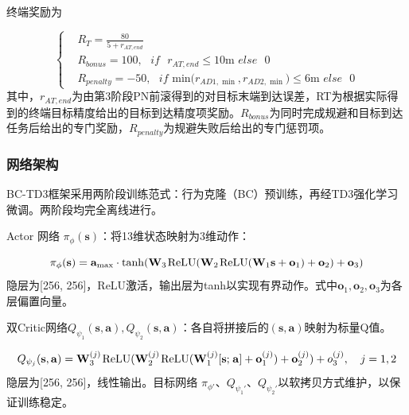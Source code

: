 终端奖励为

\begin{equation}
\label{eq:75}
\left\{
\begin{aligned}
& {R_T} = \frac{{80}}{{5 + {r_{AT,end}}}} \\
& {R_{bonus}} = 100,{\text{ }}if{\text{ }}{r_{AT,end}} \leqslant 10{\text{m }}else{\text{ }}0 \\
& {R_{penalty}} =  - 50,{\text{ }}if{\text{ min(}}{r_{AD1,\min }},{r_{AD2,\min }}{\text{)}} \leqslant 6{\text{m }}else{\text{ }}0
\end{aligned}
\right.
\end{equation}
其中，${r_{AT,end}}$为由第3阶段PN前滚得到的对目标末端到达误差，RT为根据实际得到的终端目标精度给出的目标到达精度项奖励。${R_{bonus}}$为同时完成规避和目标到达任务后给出的专门奖励，${R_{penalty}}$为规避失败后给出的专门惩罚项。

\subsubsection{网络架构}
BC-TD3框架采用两阶段训练范式：行为克隆（BC）预训练，再经TD3强化学习微调。两阶段均完全离线进行。

Actor 网络 ${\pi _\phi }({\mathbf{s}})$：将13维状态映射为3维动作：

\begin{equation}
\label{eq:76}
{\pi _\phi }({\mathbf{s}}) = {{\mathbf{a}}_{\max }} \cdot \tanh ({{\mathbf{W}}_3}{\kern 1pt} {\text{ReLU}}({{\mathbf{W}}_2}{\kern 1pt} {\text{ReLU}}({{\mathbf{W}}_1}{\mathbf{s}} + {{\mathbf{o}}_1}) + {{\mathbf{o}}_2}) + {{\mathbf{o}}_3})
\end{equation}
隐层为[256, 256]，ReLU激活，输出层为tanh以实现有界动作。式中${{\mathbf{o}}_1},{{\mathbf{o}}_2},{{\mathbf{o}}_3}$为各层偏置向量。

双Critic网络${Q_{{\psi _1}}}({\mathbf{s}},{\mathbf{a}}),{Q_{{\psi _2}}}({\mathbf{s}},{\mathbf{a}})$：各自将拼接后的$({\mathbf{s}},{\mathbf{a}})$映射为标量Q值。

\begin{equation}
\label{eq:77}
{Q_{{\psi _j}}}({\mathbf{s}},{\mathbf{a}}) = {\mathbf{W}}_3^{(j)}{\kern 1pt} {\text{ReLU}}({\mathbf{W}}_2^{(j)}{\kern 1pt} {\text{ReLU}}({\mathbf{W}}_1^{(j)}[{\mathbf{s}};{\kern 1pt} {\mathbf{a}}] + {\mathbf{o}}_1^{(j)}) + {\mathbf{o}}_2^{(j)}) + o_3^{(j)},\quad j = 1,2
\end{equation}
隐层为[256, 256]，线性输出。目标网络 \(\pi_{\phi'}\)、\(Q_{\psi_1'}\)、\(Q_{\psi_2'}\)以软拷贝方式维护，以保证训练稳定。

